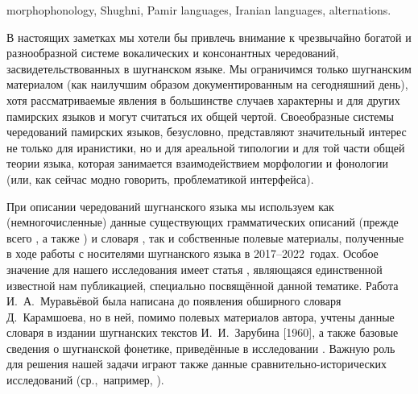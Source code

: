 \begin{eng-keywords}
morphophonology, Shughni, Pamir languages, Iranian languages, alternations.
\end{eng-keywords}

\begin{initialprint}
\end{initialprint}

В настоящих заметках мы хотели бы привлечь внимание к чрезвычайно богатой и разнообразной системе вокалических и консонантных чередований, засвидетельствованных в шугнанском языке. Мы ограничимся только шугнанским материалом (как наилучшим образом документированным на сегодняшний день), хотя рассматриваемые явления в большинстве случаев характерны и для других памирских языков и могут считаться их общей чертой. Своеобразные системы чередований памирских языков, безусловно, представляют значительный интерес не только для иранистики, но и для ареальной типологии и для той части общей теории языка, которая занимается взаимодействием морфологии и фонологии (или, как сейчас модно говорить, проблематикой интерфейса).

При описании чередований шугнанского языка мы используем как (немногочисленные) данные существующих грамматических описаний (прежде всего \parencite{karamshoev1963}, а также \parencite{edelman_yusufbekov1999_shughni}) и словаря \parencite{karamshoev1988}, так и собственные полевые материалы, полученные в ходе работы с носителями шугнанского языка в 2017–2022~годах. Особое значение для нашего исследования имеет статья \parencite{muravieva1975}, являющаяся единственной известной нам публикацией, специально посвящённой данной тематике. Работа И.~А.~Муравьёвой была написана до появления обширного словаря Д.~Карамшоева, но в ней, помимо полевых материалов автора, учтены данные словаря в издании шугнанских текстов И.~И.~Зарубина [1960], а также базовые сведения о шугнанской фонетике, приведённые в исследовании \parencite{sokolova1953}. Важную роль для решения нашей задачи играют также данные сравнительно-исторических исследований (ср.,~например, \parencites{pakhalina1983}{edelman1986}).

